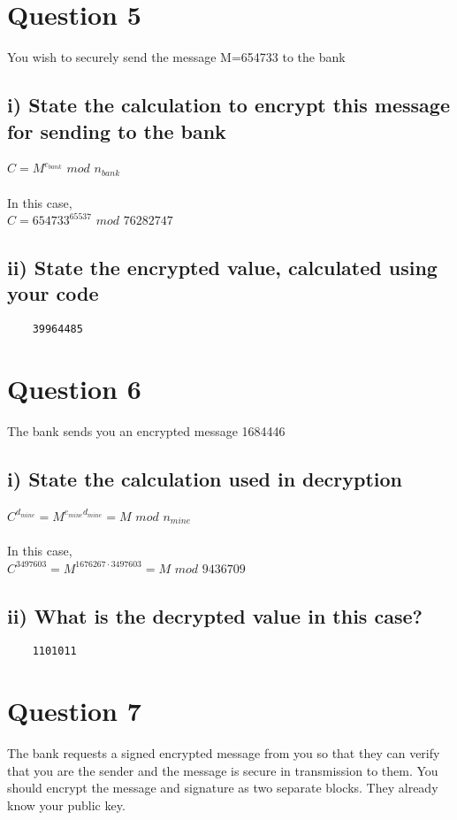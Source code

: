 \documentclass[a4paper,12pt]{article}
\begin{document}
\section*{Question 5}
You wish to securely send the message M=654733 to the bank
\subsection*{i) State the calculation to encrypt this message for sending to the bank}
$C = M^{e_{bank}}$ $mod$ $n_{bank}$\\\\
In this case,\\
$C = 654733^{65537}$ $mod$ $76282747$
\subsection*{ii) State the encrypted value, calculated using your code}
\begin{verbatim}
    39964485
\end{verbatim}

\section*{Question 6}
The bank sends you an encrypted message 1684446
\subsection*{i) State the calculation used in decryption}
$C^{d_{mine}} = M^{e_{mine}d_{mine}} = M$ $mod$ $n_{mine}$\\\\
In this case,\\
$C^{3497603} = M^{1676267\cdot3497603} = M$ $mod$ $9436709$
\subsection*{ii) What is the decrypted value in this case?}
\begin{verbatim}
    1101011
\end{verbatim}

\section*{Question 7}
The bank requests a signed encrypted message from you so that they can verify that you are the sender and the message is secure in transmission to them. You should encrypt the message and signature as two separate blocks. They already know your public key.
\end{document}
